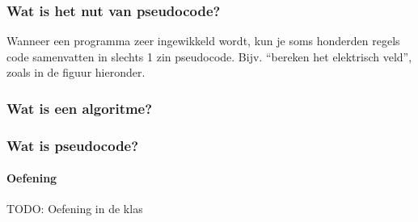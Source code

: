 \begin{frame}
\frametitle{Wat is het nut van pseudocode?}

Wanneer een programma zeer ingewikkeld wordt, kun je soms honderden regels code samenvatten in slechts 1 zin pseudocode.
Bijv. ``bereken het elektrisch veld'', zoals in de figuur hieronder.


\end{frame}


\begin{frame}
\frametitle{Wat is een algoritme?}


\end{frame}


\begin{frame}
\frametitle{Wat is pseudocode?}
\framesubtitle{Oefening}

TODO: Oefening in de klas

\end{frame}




